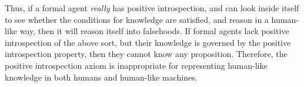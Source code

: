 Thus, if a formal agent \emph{really} has positive introspection, and can look inside itself to see whether the conditions for knowledge are satisfied, and reason in a human-like way, then it will reason itself into falsehoods. If formal agents lack positive introspection of the above sort, but their knowledge is governed by the positive introspection property, then they cannot know any proposition. Therefore, the positive introspection axiom is inappropriate for representing human-like knowledge in both humans and human-like machines.





